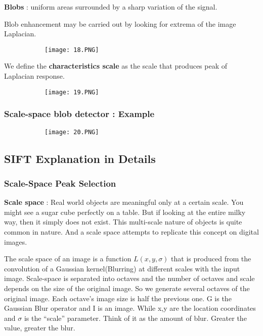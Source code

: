\documentclass{article}
\begin{document}
\textbf{Blobs} : uniform areas surrounded by a sharp variation of the signal.

Blob enhancement may be carried out by looking for extrema of the image Laplacian.

\begin{figure}[ht!]
  \centering
  \begin{subfigure}[b]{0.6\linewidth}
    \texttt{[image: 18.PNG]}
  \end{subfigure}
\end{figure}


We define the \textbf{characteristics scale} as the scale that produces peak of Laplacian response.

\begin{figure}[ht!]
  \centering
  \begin{subfigure}[b]{0.6\linewidth}
    \texttt{[image: 19.PNG]}
  \end{subfigure}
\end{figure}

\subsubsection{Scale-space blob detector : Example}


\begin{figure}[ht!]
  \centering
  \begin{subfigure}[b]{0.6\linewidth}
    \texttt{[image: 20.PNG]}
  \end{subfigure}
\end{figure}

\subsection{SIFT Explanation in Details}

\subsubsection{Scale-Space Peak Selection}

\textbf{Scale space} : Real world objects are meaningful only at a certain scale. You might see a sugar cube perfectly on a table. But if looking at the entire milky way, then it simply does not exist. This multi-scale nature of objects is quite common in nature. And a scale space attempts to replicate this concept on digital images.

The scale space of an image is a function $L(x,y,\sigma)$ that is produced from the convolution of a Gaussian kernel(Blurring) at different scales with the input image. Scale-space is separated into octaves and the number of octaves and scale depends on the size of the original image. So we generate several octaves of the original image. Each octave’s image size is half the previous one.
G is the Gaussian Blur operator and I is an image. While x,y are the location coordinates and $\sigma$ is the “scale” parameter. Think of it as the amount of blur. Greater the value, greater the blur.
\end{document}
